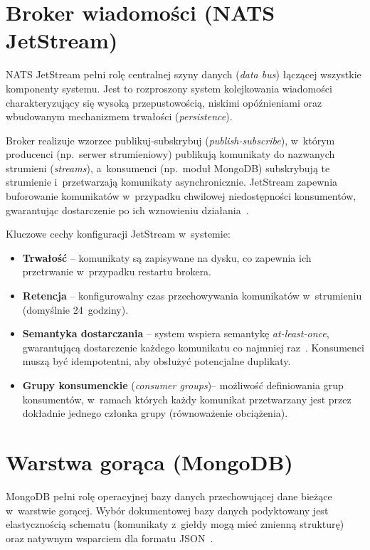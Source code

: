 \section{Broker wiadomości (NATS JetStream)}
\label{sec:nats_jetstream}

NATS JetStream pełni rolę centralnej szyny danych (\textit{data bus}) łączącej wszystkie komponenty systemu.
Jest to rozproszony system kolejkowania wiadomości charakteryzujący się wysoką przepustowością, niskimi opóźnieniami oraz
wbudowanym mechanizmem trwałości (\textit{persistence}).

Broker realizuje wzorzec publikuj-subskrybuj (\textit{publish-subscribe}), w~którym producenci (np.\ serwer
strumieniowy) publikują komunikaty do nazwanych strumieni (\textit{streams}), a~konsumenci (np.\ moduł MongoDB)
subskrybują te strumienie i~przetwarzają komunikaty asynchronicznie.
JetStream zapewnia buforowanie komunikatów w~przypadku chwilowej niedostępności konsumentów, gwarantując dostarczenie
po ich wznowieniu działania~\cite{nats_jetstream_docs_persistence_at_least_once}.

Kluczowe cechy konfiguracji JetStream w~systemie:
\begin{itemize}
    \item \textbf{Trwałość} -- komunikaty są zapisywane na dysku, co zapewnia ich przetrwanie w~przypadku restartu
    brokera.
    \item \textbf{Retencja} -- konfigurowalny czas przechowywania komunikatów w~strumieniu (domyślnie 24~godziny).
    \item \textbf{Semantyka dostarczania} -- system wspiera semantykę \textit{at-least-once}, gwarantującą dostarczenie
    każdego komunikatu co najmniej raz~\cite{nats_jetstream_docs_persistence_at_least_once,at_least_once}.
    Konsumenci muszą być idempotentni, aby obsłużyć potencjalne duplikaty.
    \item \textbf{Grupy konsumenckie} (\textit{consumer groups})-- możliwość definiowania grup konsumentów, w~ramach których każdy komunikat
    przetwarzany jest przez dokładnie jednego członka grupy (równoważenie obciążenia).
\end{itemize}


\section{Warstwa gorąca (MongoDB)}
\label{sec:mongodb}

MongoDB pełni rolę operacyjnej bazy danych przechowującej dane bieżące w~warstwie gorącej.
Wybór dokumentowej bazy danych podyktowany jest elastycznością schematu (komunikaty z~giełdy mogą mieć zmienną
strukturę) oraz natywnym wsparciem dla formatu JSON~\cite{mongo_vs_relational}.


